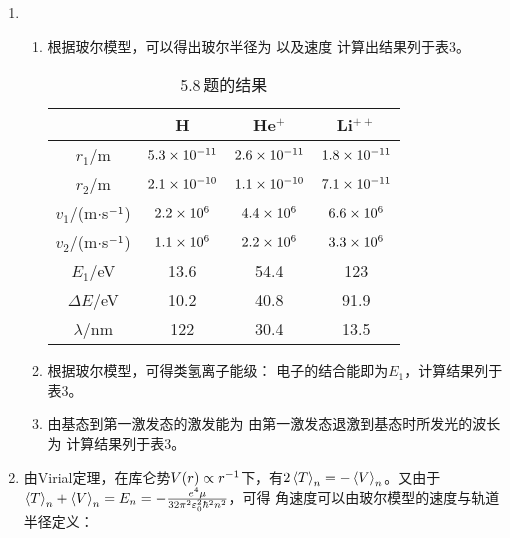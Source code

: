 \begin{enumerate}[label=\textbf{5.\arabic*}, listparindent=\parindent, leftmargin=-0.5mm]
\item 
\begin{enumerate}[label=(\arabic*)]
    \item 根据玻尔模型，可以得出玻尔半径为
    以及速度
    计算出结果列于表3。
    \begin{table}[h]
        \centering
        \begin{tabular}{c|c|c|c}
            \hline
            & H & He$^+$ & Li$^{++}$ \\
            \hline
            $r_1$/m & $5.3\times10^{-11}$ & $2.6\times10^{-11}$ & $1.8\times10^{-11}$ \\
            $r_2$/m & $2.1\times10^{-10}$ & $1.1\times10^{-10}$ & $7.1\times10^{-11}$ \\
            \hline
            $v_1$/(m$\cdot$s$^{-1}$) & $2.2\times10^{6}$ & $4.4\times10^{6}$ & $6.6\times10^{6}$ \\
            $v_2$/(m$\cdot$s$^{-1}$) & $1.1\times10^{6}$ & $2.2\times10^{6}$ & $3.3\times10^{6}$ \\
            \hline
            $E_1$/eV & 13.6 & 54.4 & 123 \\
            \hline
            $\Delta E$/eV & 10.2 & 40.8 & 91.9 \\
            $\lambda$/nm & 122 & 30.4 & 13.5 \\
            \hline
        \end{tabular}
        \caption{5.8\,题的结果}
        \label{tab:my_label}
    \end{table}
    
    \item 根据玻尔模型，可得类氢离子能级：
    电子的结合能即为$E_1$，计算结果列于表3。
    
    \item 由基态到第一激发态的激发能为
    由第一激发态退激到基态时所发光的波长为
    计算结果列于表3。
\end{enumerate}

\item 由Virial定理，在库仑势$V(r)\propto r^{-1}$下，有$2\left\langle T\right\rangle_n=-\left\langle V\right\rangle_n$。又由于$\left\langle T\right\rangle_n+\left\langle V\right\rangle_n=E_n=-\frac{e^4\mu}{32\pi^2\varepsilon_0^2\hbar^2n^2}$，可得
角速度可以由玻尔模型的速度与轨道半径定义：


\end{enumerate}
